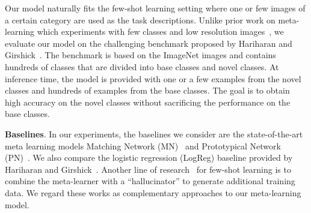 \documentclass[10pt,twocolumn,letterpaper]{article}
\newcommand{\model}{TAFE-Net\xspace}
\newcommand\minisection[1]{\vspace{2mm}\noindent \textbf{#1}}
\begin{document}
Our model naturally fits the few-shot learning setting where one or few images
of a certain category are used as the task descriptions. Unlike prior work on meta-learning 
which experiments with few classes and low resolution images~\cite{vinyals2016matching, snell2017prototypical,finn2017model}, we evaluate
our model on the challenging benchmark proposed by Hariharan and Girshick~\cite{hariharan2017low}. The benchmark is based on the ImageNet images and
contains hundreds of classes that are divided into base classes and novel classes.
At inference time, the model is provided with one or a few examples from the novel classes
and hundreds of examples from the base classes. 
The goal is to obtain high accuracy 
on the novel classes without sacrificing the performance on the base classes. 

\minisection{Baselines}. In our experiments, the  baselines we consider are the 
state-of-the-art meta learning models Matching Network (MN)~\cite{vinyals2016matching}
and Prototypical Network (PN)~\cite{snell2017prototypical}. We also compare the logistic regression (LogReg) baseline provided by Hariharan and Girshick~\cite{hariharan2017low}. Another line of research~\cite{wang2018low, hariharan2017low} for few-shot learning is to combine
the meta-learner with a ``hallucinator'' to generate additional training data. We
regard these works as complementary approaches to our meta-learning model. 
\end{document}
